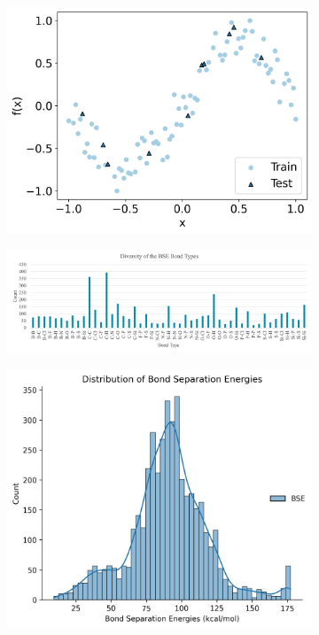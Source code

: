\documentclass[journal=jacsat,manuscript=article]{achemso}
\begin{document}
\begin{figure}[H]
\begin{subfigure}[b]{0.3\textwidth}
		\centering
		\includegraphics[width=\textwidth]{../images/Function_Fitting/function_dataset/sine_train_vs_test.png}
		\caption{}
		\label{fig:sine_train_vs_test}
	\end{subfigure}	
	\hfill
	\begin{subfigure}[b]{0.65\textwidth}
		\centering
		\includegraphics[width=\textwidth]{../images/BSE/bondtypes.png}
		\caption{}
		\label{fig:bondtypes}
	\end{subfigure}
	\hfill
	\begin{subfigure}[b]{0.3\textwidth}
		\centering
		\includegraphics[width=\textwidth]{../images/BSE/BSE.jpg}

\end{subfigure}
\end{figure}
\end{document}
